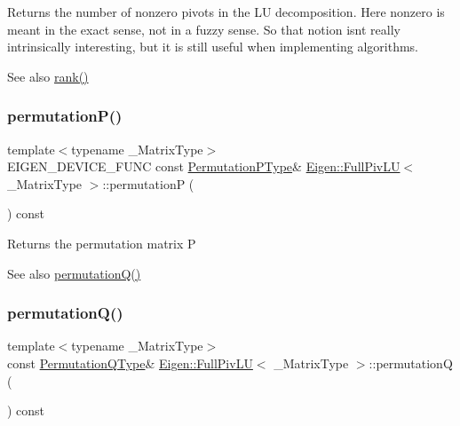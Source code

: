 \begin{DoxyReturn}{Returns}
the number of nonzero pivots in the LU decomposition. Here nonzero is meant in the exact sense, not in a fuzzy sense. So that notion isn\textquotesingle{}t really intrinsically interesting, but it is still useful when implementing algorithms.
\end{DoxyReturn}
\begin{DoxySeeAlso}{See also}
\mbox{\hyperlink{class_eigen_1_1_full_piv_l_u_a67a870aa69e699e058d04802ba0bdad9}{rank()}} 
\end{DoxySeeAlso}
\mbox{\label{class_eigen_1_1_full_piv_l_u_a09274c82240f6441af5e6c99e24e756d}} 
\subsubsection{\texorpdfstring{permutationP()}{permutationP()}}
{\footnotesize\ttfamily template$<$typename \+\_\+\+Matrix\+Type$>$ \\
E\+I\+G\+E\+N\+\_\+\+D\+E\+V\+I\+C\+E\+\_\+\+F\+U\+NC const \mbox{\hyperlink{class_eigen_1_1_permutation_matrix}{Permutation\+P\+Type}}\& \mbox{\hyperlink{class_eigen_1_1_full_piv_l_u}{Eigen\+::\+Full\+Piv\+LU}}$<$ \+\_\+\+Matrix\+Type $>$\+::permutationP (\begin{DoxyParamCaption}{ }\end{DoxyParamCaption}) const\hspace{0.3cm}{\ttfamily [inline]}}

\begin{DoxyReturn}{Returns}
the permutation matrix P
\end{DoxyReturn}
\begin{DoxySeeAlso}{See also}
\mbox{\hyperlink{class_eigen_1_1_full_piv_l_u_a8d18190c7618de271cba7293f0493a36}{permutation\+Q()}} 
\end{DoxySeeAlso}
\mbox{\label{class_eigen_1_1_full_piv_l_u_a8d18190c7618de271cba7293f0493a36}} 
\subsubsection{\texorpdfstring{permutationQ()}{permutationQ()}}
{\footnotesize\ttfamily template$<$typename \+\_\+\+Matrix\+Type$>$ \\
const \mbox{\hyperlink{class_eigen_1_1_permutation_matrix}{Permutation\+Q\+Type}}\& \mbox{\hyperlink{class_eigen_1_1_full_piv_l_u}{Eigen\+::\+Full\+Piv\+LU}}$<$ \+\_\+\+Matrix\+Type $>$\+::permutationQ (\begin{DoxyParamCaption}{ }\end{DoxyParamCaption}) const\hspace{0.3cm}{\ttfamily [inline]}}

